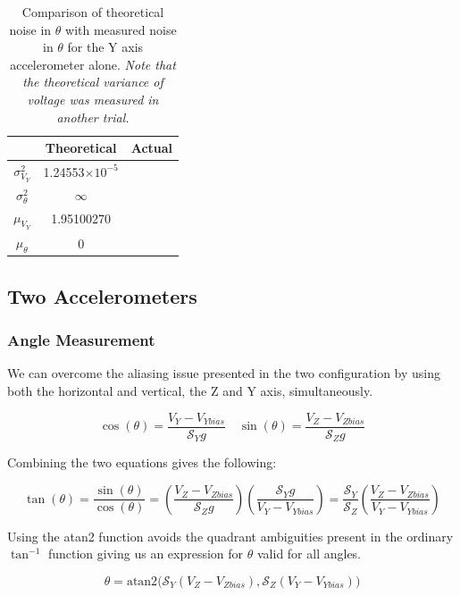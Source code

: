\documentclass{article}
\theoremstyle{plain}
\theoremstyle{definition}
\theoremstyle{remark}
\newcommand{\Sens}{\mathcal{S}}
\providecommand{\e}[1]{\ensuremath{\times 10^{#1}}}
\begin{document}
\begin{table}
\begin{center}
    \begin{tabular}{|c|c|c|}
        \hline
        ~                   & Theoretical  & Actual \\ \hline
        $\sigma^2_{V_{Y}}$    & 1.24553\e{-5}  & ~      \\ 
	$\sigma^2_{\theta}$ & $\infty$           & ~      \\ 
	$\mu_{V_{Y}}$       & 1.95100270            & ~      \\
        $\mu_{\theta}$      & 0            & ~      \\
        \hline
    \end{tabular}
\label{Noise_vertical_T}
\caption{Comparison of theoretical noise in $\theta$ with measured noise in $\theta$ for the Y axis accelerometer alone. \emph{Note that the theoretical variance of voltage was measured in another trial.}}
\end{center}
\end{table}


\subsection{Two Accelerometers}

\subsubsection{Angle Measurement}

We can overcome the aliasing issue  presented in the two configuration by using both the horizontal and vertical, the Z and Y axis, simultaneously.  

$$ \cos(\theta) = \frac{V_Y-V_{Ybias}}{\Sens_{Y} g} \quad \sin(\theta) = \frac{V_{Z} - V_{Zbias}}{\Sens_{Z} g} $$

Combining the two equations gives the following:

$$ \tan(\theta) = \frac{\sin(\theta)}{\cos(\theta)} = \left(\frac{V_{Z} - V_{Zbias}}{\Sens_{Z} g}\right) \left( \frac{\Sens_{Y} g}{V_Y-V_{Ybias}} \right) = \frac{\Sens_{Y}}{\Sens_{Z}} \left( \frac{V_{Z} - V_{Zbias}}{V_{Y} - V_{Ybias}} \right)$$

Using the atan2 function avoids the quadrant ambiguities present in the ordinary $\tan^{-1}$ function giving us an expression for $\theta$ valid for all angles.

$$\theta = \text{atan2}\big( \Sens_{Y} \left( V_{Z} - V_{Zbias}\right),  \Sens_{Z} \left( V_{Y} - V_{Ybias}\right) \big)$$
\end{document}
